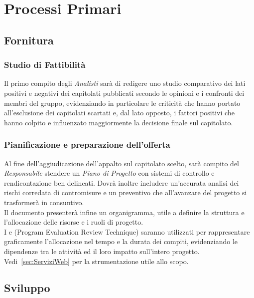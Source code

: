 \documentclass{scalatekids-article}
\begin{document}
\section{Processi Primari}

\subsection{Fornitura}

\subsubsection{Studio di Fattibilità}

Il primo compito degli \textit{Analisti} sarà di redigere uno studio comparativo
dei lati positivi e negativi dei capitolati pubblicati secondo le opinioni e i
confronti dei membri del gruppo, evidenziando in particolare le criticità che
hanno portato all'esclusione dei capitolati scartati e, dal lato opposto, i
fattori positivi che hanno colpito e influenzato maggiormente la decisione
finale sul capitolato.

\subsubsection{Pianificazione e preparazione dell'offerta}

Al fine dell'aggiudicazione dell'appalto sul capitolato scelto, sarà compito del
\textit{Responsabile} stendere un \textit{Piano di Progetto} con sistemi di
controllo e rendicontazione ben delineati. Dovrà inoltre includere un'accurata
analisi dei rischi corredata di contromisure e un preventivo che all'avanzare
del progetto si trasformerà in consuntivo.\\
Il documento presenterà infine un organigramma, utile a definire la struttura
e l'allocazione delle risorse e i ruoli di progetto.\\
I  e  (Program Evaluation Review
Technique) saranno utilizzati per rappresentare graficamente l'allocazione nel
tempo e la durata dei compiti, evidenziando le dipendenze tra le attività ed
il loro impatto sull'intero progetto.\\
Vedi~\ref{sec:ServiziWeb} per la strumentazione utile allo scopo.

\subsection{Sviluppo}
\end{document}
